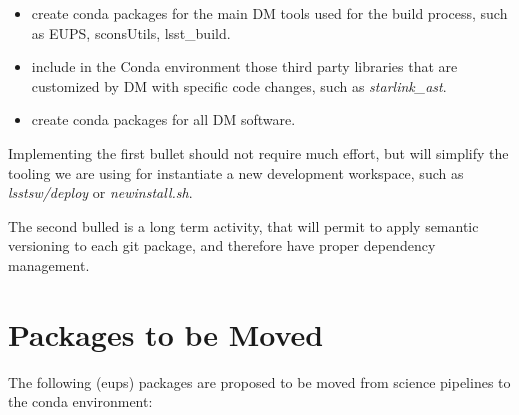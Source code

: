 \begin{itemize}
\item create conda packages for the main DM tools used for the build process, such as EUPS, sconsUtils, lsst\_build. 
\item include in the Conda environment those third party libraries that are customized by DM with specific code changes, such as \textit{starlink\_ast}.
\item create conda packages for all DM software.
\end{itemize}

Implementing the first bullet should not require much effort, but will simplify the tooling we are using for instantiate a new development workspace, such as \textit{lsstsw/deploy} or \textit{newinstall.sh}.

The second bulled is a long term activity, that will permit to apply semantic versioning to each git package, and therefore have proper dependency management.


\newpage
\appendix
\section{Packages to be Moved} \label{sec:tomove}

The following (eups) packages are proposed to be moved from science pipelines to the conda environment:

